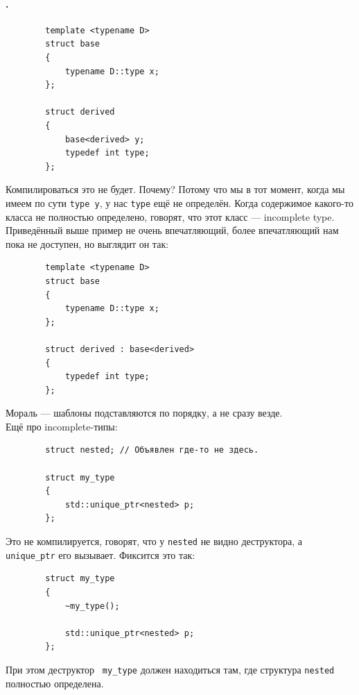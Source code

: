 \documentclass{article}
\begin{document}
    \paragraph{.}
    \begin{verbatim}
        template <typename D>
        struct base
        {
            typename D::type x;
        };

        struct derived
        {
            base<derived> y;
            typedef int type;
        };
    \end{verbatim}
    Компилироваться это не будет. Почему? Потому что мы в тот момент, когда мы имеем по сути \texttt{type y}, у нас \texttt{type} ещё не определён. Когда содержимое какого-то класса не полностью определено, говорят, что этот класс --- incomplete type. Приведённый выше пример не очень впечатляющий, более впечатляющий нам пока не доступен, но выглядит он так:
    \begin{verbatim}
        template <typename D>
        struct base
        {
            typename D::type x;
        };

        struct derived : base<derived>
        {
            typedef int type;
        };
    \end{verbatim}
    Мораль --- шаблоны подставляются по порядку, а не сразу везде.\\
    Ещё про incomplete-типы:
    \begin{verbatim}
        struct nested; // Объявлен где-то не здесь.

        struct my_type
        {
            std::unique_ptr<nested> p;
        };
    \end{verbatim}
    Это не компилируется, говорят, что у \texttt{nested} не видно деструктора, а \texttt{unique_ptr} его вызывает. Фиксится это так:
    \begin{verbatim}
        struct my_type
        {
            ~my_type();

            std::unique_ptr<nested> p;
        };
    \end{verbatim}
    При этом деструктор \texttt{~my_type} должен находиться там, где структура \texttt{nested} полностью определена.
\end{document}
